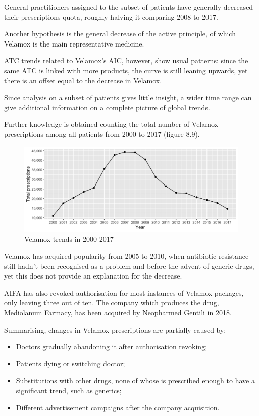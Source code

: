 General practitioners assigned to the subset of patients have generally decreased their prescriptions quota, roughly halving it comparing 2008 to 2017.

Another hypothesis is the general decrease of the active principle, of which Velamox is the main representative medicine.

ATC trends related to Velamox's AIC, however, show usual patterns: since the same ATC is linked with more products, the curve is still leaning upwards, yet there is an offset equal to the decrease in Velamox.

Since analysis on a subset of patients gives little insight, a wider time range can give additional information on a complete picture of global trends. 

Further knowledge is obtained counting the total number of Velamox prescriptions among all patients from 2000 to 2017 (figure 8.9).

\begin{figure}[h]
	\centering
	\includegraphics[scale=0.3]{../plots/velamox-year.png}
	\caption{\small Velamox trends in 2000-2017}
\end{figure}

Velamox has acquired popularity from 2005 to 2010, when antibiotic resistance still hadn't been recognised as a problem and before the advent of generic drugs, yet this does not provide an explanation for the decrease.

AIFA has also revoked authorisation for most instances of Velamox packages, only leaving three out of ten. The company which produces the drug, Mediolanum Farmacy, has been acquired by Neopharmed Gentili in 2018.

Summarising, changes in Velamox prescriptions are partially caused by:
\begin{itemize}
	\item Doctors gradually abandoning it after authorisation revoking;
	\item Patients dying or switching doctor;
	\item Substitutions with other drugs, none of whose is prescribed enough to have a significant trend, such as generics;
	\item Different advertisement campaigns after the company acquisition.
\end{itemize}

